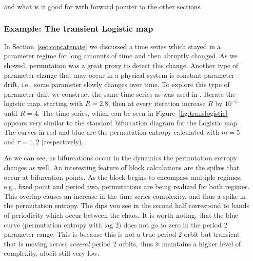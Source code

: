
%






and what is it good for with forward pointer to the other sections



\subsubsection{Example: The transient Logistic map}
In Section~\ref{sec:concatenate} we discussed a time series which stayed in a parameter regime for long amounts of time and then abruptly changed. As we showed, permutation was a great proxy to detect this change. Another type of parameter change that may occur in a physical system is constant parameter drift, i.e., some parameter slowly changes over time. To explore this type of parameter drift we construct the same time series as was used in \cite{cao2004det}. Iterate the logistic map, starting with $R=2.8$, then at every iteration increase $R$ by $10^{-5}$ until $R=4$. The time series, which can be seen in Figure~\ref{fig:translogistic} appears very similar to the standard bifurcation diagram for the Logistic map. The curves in red and blue are the permutation entropy calculated with $m=5$ and $\tau = 1,2$ (respectively).

 As we can see, as bifurcations occur in the dynamics the permutation entropy changes as well. An interesting feature of block calculations are the spikes that occur at bifurcation points. As the block begins to encompass multiple regimes, e.g., fixed point and  period two, permutations are being realized for both regimes. This overlap causes an increase in the time series complexity, and thus a spike in the permutation entropy. The dips you see in the second half correspond to bands of periodicity which occur between the chaos. It is worth noting, that the blue curve (permutation entropy with lag 2) does not go to zero in the period 2 parameter range. This is because this is not a true period 2 orbit but transient that is moving across \emph{several} period 2 orbits, thus it maintains a higher level of complexity, albeit still very low.

